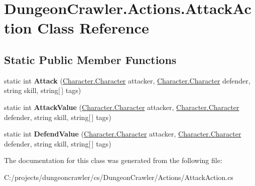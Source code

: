 \hypertarget{class_dungeon_crawler_1_1_actions_1_1_attack_action}{}\section{Dungeon\+Crawler.\+Actions.\+Attack\+Action Class Reference}
\label{class_dungeon_crawler_1_1_actions_1_1_attack_action}
\subsection*{Static Public Member Functions}
\begin{DoxyCompactItemize}
\item 
\hypertarget{class_dungeon_crawler_1_1_actions_1_1_attack_action_a00cb6f544451898de19eacc042da132d}{}static int {\bfseries Attack} (\hyperlink{class_dungeon_crawler_1_1_character_1_1_character}{Character.\+Character} attacker, \hyperlink{class_dungeon_crawler_1_1_character_1_1_character}{Character.\+Character} defender, string skill, string\mbox{[}$\,$\mbox{]} tags)\label{class_dungeon_crawler_1_1_actions_1_1_attack_action_a00cb6f544451898de19eacc042da132d}

\item 
\hypertarget{class_dungeon_crawler_1_1_actions_1_1_attack_action_a866ee862d686e78b7ce0d86cbe672a0a}{}static int {\bfseries Attack\+Value} (\hyperlink{class_dungeon_crawler_1_1_character_1_1_character}{Character.\+Character} attacker, \hyperlink{class_dungeon_crawler_1_1_character_1_1_character}{Character.\+Character} defender, string skill, string\mbox{[}$\,$\mbox{]} tags)\label{class_dungeon_crawler_1_1_actions_1_1_attack_action_a866ee862d686e78b7ce0d86cbe672a0a}

\item 
\hypertarget{class_dungeon_crawler_1_1_actions_1_1_attack_action_a728681dbf4203322829e59a363705cea}{}static int {\bfseries Defend\+Value} (\hyperlink{class_dungeon_crawler_1_1_character_1_1_character}{Character.\+Character} attacker, \hyperlink{class_dungeon_crawler_1_1_character_1_1_character}{Character.\+Character} defender, string skill, string\mbox{[}$\,$\mbox{]} tags)\label{class_dungeon_crawler_1_1_actions_1_1_attack_action_a728681dbf4203322829e59a363705cea}

\end{DoxyCompactItemize}


The documentation for this class was generated from the following file\+:\begin{DoxyCompactItemize}
\item 
C\+:/projects/dungeoncrawler/cs/\+Dungeon\+Crawler/\+Actions/Attack\+Action.\+cs\end{DoxyCompactItemize}
